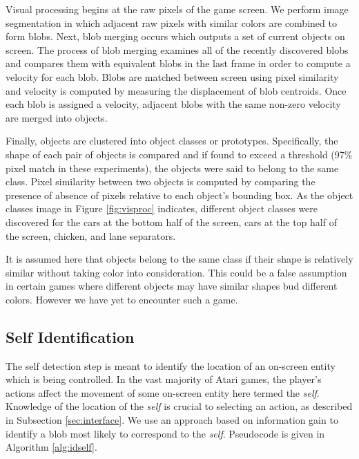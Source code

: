 \documentclass{acm_proc_article-sp}
\begin{document}
Visual processing begins at the raw pixels of the game screen. We perform image segmentation in which adjacent raw pixels with similar colors are combined to form blobs. Next, blob merging occurs which outputs a set of current objects on screen. The process of blob merging examines all of the recently discovered blobs and compares them with equivalent blobs in the last frame in order to compute a velocity for each blob. Blobs are matched between screen using pixel similarity and velocity is computed by measuring the displacement of blob centroids. Once each blob is assigned a velocity, adjacent blobs with the same non-zero velocity are merged into objects. 

Finally, objects are clustered into object classes or prototypes. Specifically, the shape of each pair of objects is compared and if found to exceed a threshold (97\% pixel match in these experiments), the objects were said to belong to the same class. Pixel similarity between two objects is computed by comparing the presence of absence of pixels relative to each object's bounding box. As the object classes image in Figure \ref{fig:visproc} indicates, different object classes were discovered for the cars at the bottom half of the screen, cars at the top half of the screen, chicken, and lane separators. 


It is assumed here that objects belong to the same class if their shape is relatively similar without taking color into consideration. This could be a false assumption in certain games where different objects may have similar shapes bud different colors. However we have yet to encounter such a game.

\subsection{Self Identification}
The self detection step is meant to identify the location of an on-screen entity which is being controlled. In the vast majority of Atari games, the player's actions affect the movement of some on-screen entity here termed the \textit{self}. Knowledge of the location of the \textit{self} is crucial to selecting an action, as described in Subsection \ref{sec:interface}. We use an approach based on information gain to identify a blob most likely to correspond to the \textit{self}. Pseudocode is given in Algorithm \ref{alg:idself}.
\end{document}
